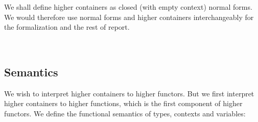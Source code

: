 We shall define higher containers as closed (with empty context) normal forms. We would therefore use normal forms and higher containers interchangeably for the formalization and the rest of report.

\begin{code}%
\>[0]\AgdaSpace{}%
\AgdaSymbol{:}\AgdaSpace{}%
\AgdaSpace{}%
\AgdaSpace{}%
\<%
\\
\>[0]\AgdaSpace{}%
\AgdaSpace{}%
\AgdaSymbol{=}\AgdaSpace{}%
\AgdaSpace{}%
\AgdaSpace{}%
\<%
\end{code}

\subsection{Semantics}

We wish to interpret higher containers to higher functors. But we first interpret higher containers to higher functions, which is the first component of higher functors. We define the functional semantics of types, contexts and variables:

